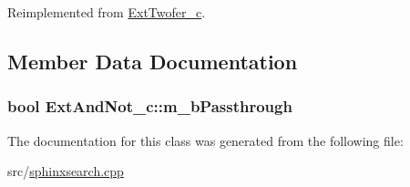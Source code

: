 Reimplemented from \hyperlink{classExtTwofer__c_a4873bd7fe4efcb00a6cbe483a716f29b}{Ext\-Twofer\-\_\-c}.



\subsection{Member Data Documentation}
\hypertarget{classExtAndNot__c_a162817309144fe99e23ce138e0216460}{
\subsubsection[{m\-\_\-b\-Passthrough}]{\setlength{\rightskip}{0pt plus 5cm}bool Ext\-And\-Not\-\_\-c\-::m\-\_\-b\-Passthrough\hspace{0.3cm}{\ttfamily [protected]}}}\label{classExtAndNot__c_a162817309144fe99e23ce138e0216460}


The documentation for this class was generated from the following file\-:\begin{DoxyCompactItemize}
\item 
src/\hyperlink{sphinxsearch_8cpp}{sphinxsearch.\-cpp}\end{DoxyCompactItemize}
